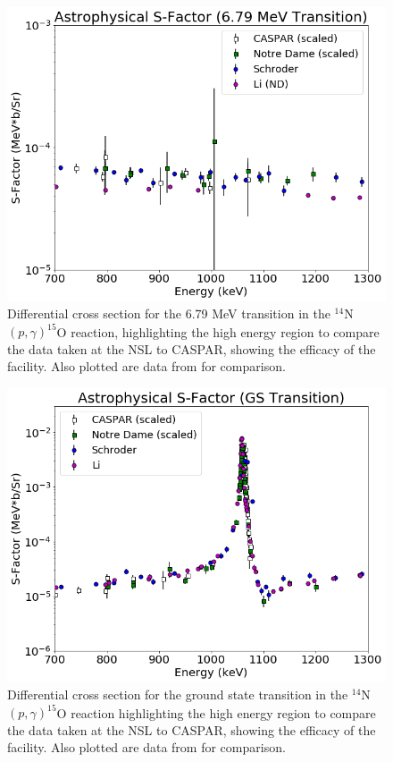 \begin{figure}
		\includegraphics[width=1.0\linewidth]{figures/highCompare679.png}
	\caption{Differential cross section for the 6.79 MeV transition in the $^{14}$N$\left( p,\gamma \right) ^{15}$O reaction, highlighting the high energy region to compare the data taken at the NSL to CASPAR, showing the efficacy of the facility. Also plotted are data from \cite{Schroder1987, Li2016} for comparison.  }
	\label{fig: highCompare679}
\end{figure}


\begin{figure}
		\includegraphics[width=1.0\linewidth]{figures/highCompareGS.png}
	\caption{Differential cross section for the ground state transition in the $^{14}$N$\left( p,\gamma \right) ^{15}$O reaction highlighting the high energy region to compare the data taken at the NSL to CASPAR, showing the efficacy of the facility. Also plotted are data from \cite{Schroder1987, Li2016} for comparison.  }
	\label{fig: highCompareGS}
\end{figure}

